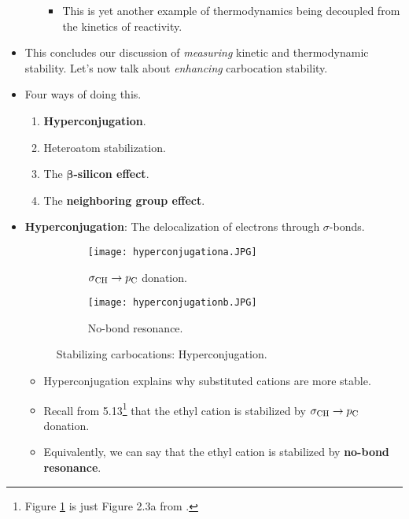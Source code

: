 \documentclass[../notes.tex]{subfiles}
\begin{document}
\begin{itemize}
\begin{itemize}
        \begin{itemize}
            \item This is yet another example of thermodynamics being decoupled from the kinetics of reactivity.
        \end{itemize}
    \end{itemize}
    \item This concludes our discussion of \emph{measuring} kinetic and thermodynamic stability. Let's now talk about \emph{enhancing} carbocation stability.
    \item Four ways of doing this.
    \begin{enumerate}
        \item \textbf{Hyperconjugation}.
        \item Heteroatom stabilization.
        \item The \textbf{$\bm{\beta}$-silicon effect}.
        \item The \textbf{neighboring group effect}.
    \end{enumerate}
    \item \textbf{Hyperconjugation}: The delocalization of electrons through $\sigma$-bonds.
    \begin{figure}[h!]
        \centering
        \begin{subfigure}[b]{0.3\linewidth}
            \centering
            \texttt{[image: hyperconjugationa.JPG]}
            \caption{$\sigma_{\ce{CH}}\to p_{\ce{C}}$ donation.}
            \label{fig:hyperconjugationa}
        \end{subfigure}
        \begin{subfigure}[b]{0.3\linewidth}
            \centering
            \texttt{[image: hyperconjugationb.JPG]}
            \caption{No-bond resonance.}
            \label{fig:hyperconjugationb}
        \end{subfigure}
        \caption{Stabilizing carbocations: Hyperconjugation.}
        \label{fig:hyperconjugation}
    \end{figure}
    \begin{itemize}
        \item Hyperconjugation explains why substituted cations are more stable.
        \item Recall from 5.13\footnote{Figure \ref{fig:hyperconjugationa} is just Figure 2.3a from \textcite{bib:5-13Notes}.} that the ethyl cation is stabilized by $\sigma_{\ce{CH}}\to p_{\ce{C}}$ donation.
        \item Equivalently, we can say that the ethyl cation is stabilized by \textbf{no-bond resonance}.

\end{itemize}
\end{itemize}
\end{document}
